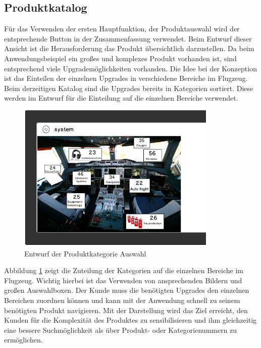 \subsection{Produktkatalog}
Für das Verwenden der ersten Hauptfunktion, der Produktauswahl wird der entsprechende Button in der Zusammenfassung verwendet. Beim Entwurf dieser Ansicht ist die Herausforderung das Produkt übersichtlich darzustellen. Da beim Anwendungsbeispiel ein großes und komplexes Produkt vorhanden ist, sind entsprechend viele Upgrademöglichkeiten vorhanden. Die Idee bei der Konzeption ist das Einteilen der einzelnen Upgrades in verschiedene Bereiche im Flugzeug. Beim derzeitigen Katalog sind die Upgrades bereits in Kategorien sortiert. Diese werden im Entwurf für die Einteilung auf die einzelnen Bereiche verwendet. \par

\begin{figure}
\centering
\includegraphics[width=360px]{images/catalogue_entwurf}
\caption{Entwurf der Produktkategorie Auswahl}
\label{catalogueSketch}
\end{figure}
Abbildung \ref{catalogueSketch} zeigt die Zuteilung der Kategorien auf die einzelnen Bereiche im Flugzeug. Wichtig hierbei ist das Verwenden von ansprechenden Bildern und großen Auswahlboxen. Der Kunde muss die benötigten Upgrades den einzelnen Bereichen zuordnen können und kann mit der Anwendung schnell zu seinem benötigten Produkt navigieren. Mit der Darstellung wird das Ziel erreicht, den Kunden für die Komplexität des Produktes zu sensibilisieren und ihm gleichzeitig eine bessere Suchmöglichkeit als über Produkt- oder Kategorienummern zu ermöglichen. \par 

